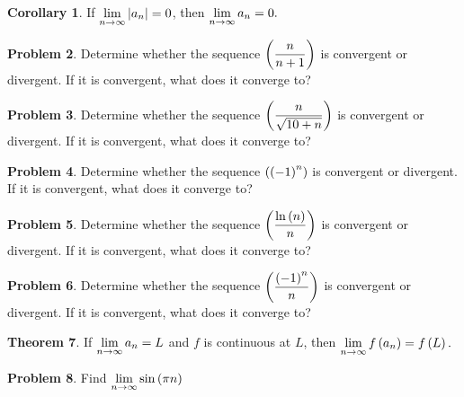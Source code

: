 \documentclass[letterpaper, twoside, 12pt]{book}
\theoremstyle{definition}
\newtheorem{theorem}{Theorem}
\theoremstyle{definition}
\newtheorem{problem}[theorem]{Problem}
\newtheorem{corollary}[theorem]{Corollary}
\newcommand{\ds}{\ensuremath{\displaystyle}}
\begin{document}
\begin{corollary}
 If $\ds \lim_{n \rightarrow \infty} \left|a_n\right| = 0$, then $\ds \lim_{n \rightarrow \infty} a_n = 0.$
\end{corollary}

\begin{problem}
 Determine whether the sequence $\ds \left(\frac{n}{n+1}\right)$ is convergent or divergent.  If it is convergent, what does it converge to?
\end{problem}

\vfill

\begin{problem}
 Determine whether the sequence $\ds \left( \frac{n}{\sqrt{10+n}} \right)$ is convergent or divergent.  If it is convergent, what does it converge to?
\end{problem}

\vfill

\begin{problem}
 Determine whether the sequence $\ds \left( \left(-1\right)^n \right)$ is convergent or divergent.  If it is convergent, what does it converge to?
\end{problem}


\vfill

\begin{problem}
 Determine whether the sequence $\ds \left( \frac{\ln\left(n\right)}{n} \right)$ is convergent or divergent.  If it is convergent, what does it converge to?
\end{problem}

\vfill

\newpage

\begin{problem}
 Determine whether the sequence $\ds \left( \frac{\left(-1\right)^n}{n} \right)$ is convergent or divergent.  If it is convergent, what does it converge to?
\end{problem}

\vfill

\begin{theorem}
 If $\ds \lim_{n \rightarrow \infty} a_n = L$ and $f$ is continuous at $L$, then $\ds \lim_{n \rightarrow \infty} f\left(a_n\right) = f\left(L\right).$
\end{theorem}

\begin{problem}
 Find $\ds \lim_{n \rightarrow \infty} \sin\left(\pi n\right)$
\end{problem}
\end{document}
